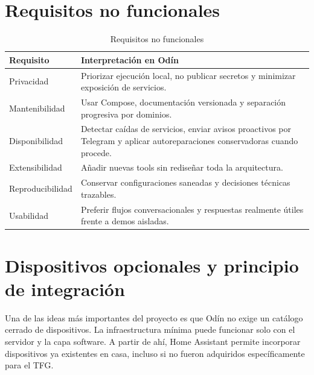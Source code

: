 \section{Requisitos no funcionales}
\begin{table}[H]
  \centering
  \caption{Requisitos no funcionales}
  \label{tab:requisitos-no-funcionales}
  \begin{tabularx}{\textwidth}{lX}
    \toprule
    Requisito & Interpretación en Odín \\
    \midrule
    Privacidad & Priorizar ejecución local, no publicar secretos y minimizar exposición de servicios. \\
    Mantenibilidad & Usar Compose, documentación versionada y separación progresiva por dominios. \\
    Disponibilidad & Detectar caídas de servicios, enviar avisos proactivos por Telegram y aplicar autoreparaciones conservadoras cuando procede. \\
    Extensibilidad & Añadir nuevas tools sin rediseñar toda la arquitectura. \\
    Reproducibilidad & Conservar configuraciones saneadas y decisiones técnicas trazables. \\
    Usabilidad & Preferir flujos conversacionales y respuestas realmente útiles frente a demos aisladas. \\
    \bottomrule
  \end{tabularx}
\end{table}

\section{Dispositivos opcionales y principio de integración}
Una de las ideas más importantes del proyecto es que Odín no exige un catálogo cerrado de dispositivos. La infraestructura mínima puede funcionar solo con el servidor y la capa software. A partir de ahí, Home Assistant permite incorporar dispositivos ya existentes en casa, incluso si no fueron adquiridos específicamente para el TFG.

